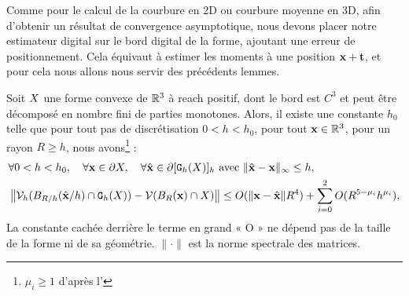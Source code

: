 %
Comme pour le calcul de la courbure en 2D ou courbure moyenne en 3D, afin d'obtenir un
résultat de convergence asymptotique, nous devons placer notre estimateur
digital sur le bord digital de la forme, ajoutant une erreur de positionnement.
Cela équivaut à estimer les moments à une position $\mathbf{x} + \mathbf{t}$, et pour cela
nous allons nous servir des précédents lemmes.
%
\begin{theorem}{}
\label{thm:multigrid-conv-cov-matrix}
%
  Soit $X$ une forme convexe de $\mathbb{R}^3$ à reach positif, dont le bord est
  $C^3$ et peut être décomposé en nombre fini de parties monotones. Alors, il
  existe une constante $h_0$ telle que pour tout pas de discrétisation $0 < h <
  h_0$, pour tout $\mathbf{x} \in \mathbb{R}^3$, pour un rayon $R \ge h$, nous
  avons\footnote{$\mu_i \ge 1$ d'après
  l'} :
%
  \begin{align}
    &\forall 0 < h < h_0, \quad \forall \mathbf{x} \in \partial X, \quad
    \forall \hat{\mathbf{x}} \in \partial \lbrack \mathtt{G}_{h}(X) \rbrack_{h} \text{~avec~} \| \hat{\mathbf{x}} -\mathbf{x}\|_\infty \le h, \nonumber \\
    &\left\| \mathcal{V}_{h}( B_{R/h}(\hat{\mathbf{x}}/h) \cap  \mathtt{G}_{h}(X) ) - \mathcal{V}( B_{R}(\mathbf{x}) \cap X )\right \|\le O(\|\mathbf{x}-\hat{\mathbf{x}}\| R^4) + \sum_{i=0}^2 O(R^{5-\mu_i}h^{\mu_i}),
  \end{align}
  La constante cachée derrière le terme en grand « O » ne dépend pas de la
  taille de la forme ni de sa géométrie. $\|\cdot\|$ est la norme spectrale des
  matrices.
\end{theorem}
